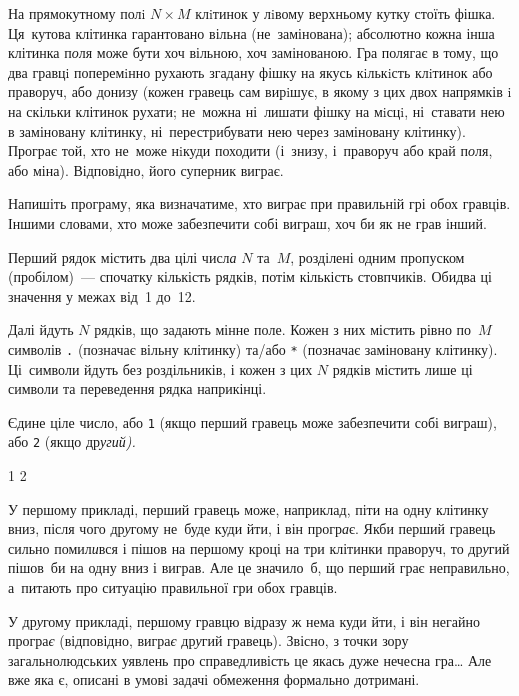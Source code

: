 ﻿На прямокутному полi $N{\times}M$ клiтинок у лiвому верхньому кутку стоїть фішка. Ця~кутова клітинка гарантовано вільна (не~замінована); абсолютно кожна інша клітинка п{\it о}ля може бути хоч вільною, хоч замінованою. 
Гра полягає в тому, що два гравцi поперемiнно рухають згадану фішку на якусь кiлькiсть клiтинок або праворуч, або донизу (кожен гравець сам вирiшує, в якому з цих двох напрямків i на скільки клітинок рухати; не~можна ні~лишати фішку на мiсцi, ні~ставати нею в заміновану клітинку, ні~перестрибувати нею через заміновану клітинку).
Програє той, хто не~може нiкуди походити (і~знизу, і~праворуч або край п{\it о}ля, або міна). Відповідно, його суперник виграє.

Напишіть програму, яка визначатиме, хто виграє при правильній грі обох гравців. 
Іншими словами, хто може забезпечити собі виграш, хоч би як не грав інший.

\InputFile
Перший рядок містить два цілі числ{\it а} $N$ та~$M$, розділені одним пропуском (пробілом)~--- спочатку кількість рядків, потім кількість стовпчиків. Обидва ці значення у межах від~1 до~12.

Далі йдуть $N$ рядків, що задають мінне поле. Кожен з них містить рівно по~$M$ символів \texttt{.} (позначає вільну клітинку) та/або \texttt{*} (позначає заміновану клітинку). Ці~символи йдуть без роздільників, і кожен з цих $N$ рядків містить лише ці символи та переведення рядка наприкінці.

\OutputFile
Єдине ціле число, або \texttt{1} (якщо перший гравець може забезпечити собі виграш), або \texttt{2} (якщо др\it{у}гий).

\Examples
\begin{example}
{1
}
{2
}
\end{example}

\Note
У першому прикладі, перший гравець може, наприклад, піти на одну клітинку вниз, після чого др{\it у}гому не~буде куди йти, і він прогр{\it а}є. 
Якби перший гравець сильно помил{\it и}вся і пішов на першому кроці на три клітинки праворуч, то др{\it у}гий пішов~би на одну вниз і виграв. Але це значило~б, що перший грає неправильно, а~питають про ситуацію правильної гри обох гравців.

У др{\it у}гому прикладі, першому гравцю відразу ж нема куди йти, і він негайно програ{\it є} (відповідно, вигра{\it є} др{\it у}гий гравець). Звісно, з точки зору загальнолюдських уявлень про справедливість це якась дуже нечесна гра\dots  
Але вже яка є, описані в умові задачі обмеження формально дотримані.